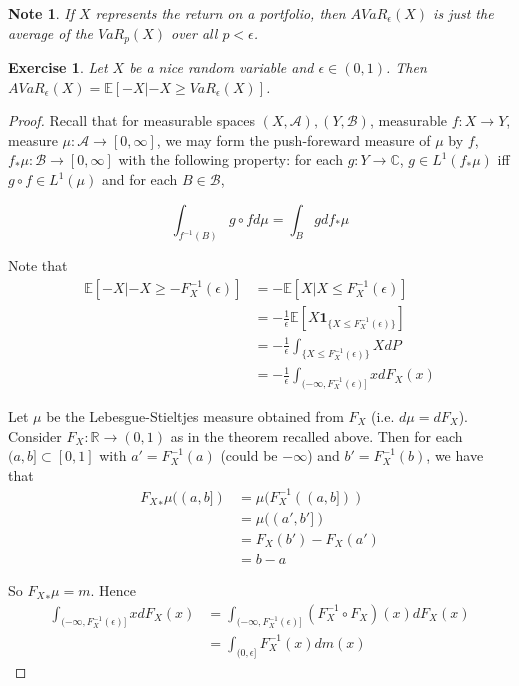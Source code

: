 \documentclass[12pt]{amsart}
\newtheorem{note}[thm]{Note}
\newtheorem{ex}[thm]{Exercise}
\newcommand{\ep}{\epsilon}
\newcommand{\C}{\mathbb{C}}
\newcommand{\E}{\mathbb{E}}
\newcommand{\R}{\mathbb{R}}
\newcommand{\MA}{\mathcal{A}}
\newcommand{\MB}{\mathcal{B}}
\newcommand{\RG}{[0,\infty]}
\begin{document}
\begin{note}
If $X$ represents the return on a portfolio, then $AVaR_{\ep}(X)$ is just the average of the $VaR_{p}(X)$ over all $p< \ep$.
\end{note}

\begin{ex}
Let $X$ be a nice random variable and $\ep \in (0,1)$. Then $AVaR_{\ep}(X) = \E[-X|-X \geq VaR_{\ep}(X)]$.
\end{ex}

\begin{proof}
Recall that for measurable spaces $(X,\MA), (Y, \MB)$, measurable $f:X \rightarrow Y$, measure $\mu:\MA \rightarrow \RG$, we may form the push-foreward measure of $\mu$ by $f$, $f_{*}\mu:\MB \rightarrow \RG$ with the following property: for each $g:Y \rightarrow \C$, $g \in L^1(f_* \mu)$ iff  $g \circ f \in L^1(\mu)$ and for each $B \in \MB$, 

$$\int_{f^{-1}(B)}g \circ f d\mu = \int_B g d f_*\mu$$

Note that 
\begin{align*}
\E[-X|-X \geq -F^{-1}_X(\ep)] 
&= -\E[X|X \leq F^{-1}_X(\ep)] \\ 
&= -\frac{1}{\ep}\E [X\mathbf{1}_{\{X \leq F^{-1}_X(\ep)\}}] \\ 
&= - \frac{1}{\ep} \int_{\{X \leq F_X^{-1}(\ep)\}}XdP \\
& = -\frac{1}{\ep} \int_{(-\infty, F_X^{-1}(\ep)]}xd F_X(x)
\end{align*}

Let $\mu$ be the Lebesgue-Stieltjes measure obtained from $F_X$ (i.e. $d \mu = dF_X$). Consider $F_X: \R \rightarrow (0,1)$ as in the theorem recalled above. Then for each $(a,b] \subset [0,1]$ with $a' =  F_X^{-1}(a)$ (could be $-\infty$) and $b' = F_X^{-1}(b)$, we have that 
\begin{align*}
{F_X}_{*} \mu ((a,b]) 
&= \mu(F^{-1}_X((a,b]))\\
&= \mu((a', b']) \\ 
&= F_X(b') - F_X(a')\\
&= b-a
\end{align*}

So ${F_X}_{*} \mu = m$. Hence  
\begin{align*}
\int_{(-\infty, F_X^{-1}(\ep)]}xd F_X(x) 
&= \int_{(-\infty, F_X^{-1}(\ep)]}(F^{-1}_X \circ F_X) (x)d F_X(x) \\
&= \int_{(0,\ep]} F^{-1}_X(x)dm(x)
\end{align*}
\end{proof}
\end{document}
